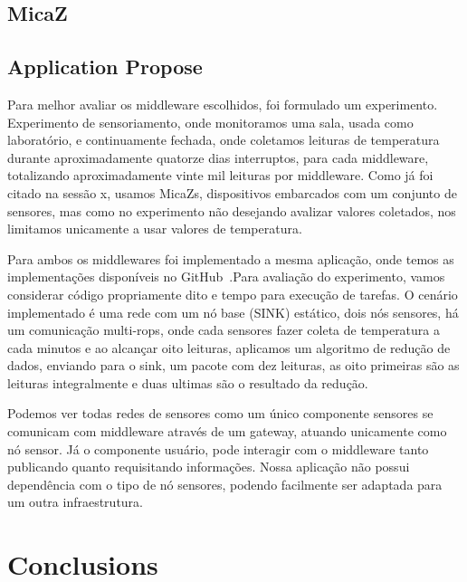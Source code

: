 \documentclass[12pt]{article}
\begin{document}
\subsection{MicaZ}

\subsection{Application Propose}
Para melhor avaliar os middleware escolhidos, foi formulado um experimento. Experimento de sensoriamento, onde monitoramos uma sala, usada como laboratório, e continuamente fechada, onde coletamos leituras de temperatura durante aproximadamente quatorze dias interruptos, para cada middleware, totalizando aproximadamente vinte mil leituras por middleware. Como já foi citado na sessão x, usamos MicaZs, dispositivos embarcados com um conjunto de sensores, mas como no experimento não desejando avalizar valores coletados, nos limitamos unicamente a usar valores de temperatura.


Para ambos os middlewares foi implementado a mesma aplicação, onde temos as implementações disponíveis no GitHub~\cite{jcl-app}.Para avaliação do experimento, vamos considerar código propriamente dito e tempo para execução de tarefas. O cenário implementado é uma rede com um nó base (SINK) estático, dois nós sensores, há um comunicação multi-rops, onde cada sensores fazer coleta de temperatura a cada minutos e ao alcançar oito leituras, aplicamos um algoritmo de redução de dados, enviando para o sink, um pacote com dez leituras, as oito primeiras são as leituras integralmente e duas ultimas são o resultado da redução.

Podemos ver todas redes de sensores como um único componente sensores se comunicam com middleware através de um gateway, atuando unicamente como nó sensor. Já o componente usuário, pode interagir com o middleware tanto publicando quanto requisitando informações. Nossa aplicação não possui dependência com o tipo de nó sensores, podendo facilmente ser adaptada para um outra infraestrutura.

\section{Conclusions}
\end{document}
